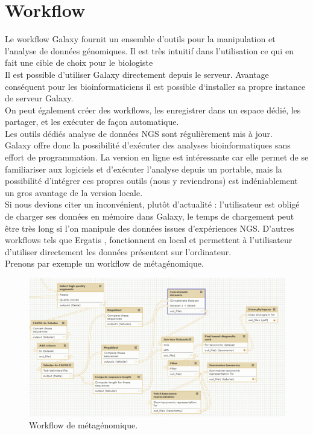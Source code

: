 \section{Workflow}

Le workflow Galaxy fournit un ensemble d’outils pour la manipulation et l’analyse de données génomiques. Il est très intuitif dans l’utilisation ce qui en fait une cible de choix pour le biologiste\\

Il est possible d’utiliser Galaxy directement depuis le serveur. Avantage conséquent pour les bioinformaticiens il est possible d‘installer sa propre instance de serveur Galaxy.\\

On peut également créer des workflows, les enregistrer dans un espace dédié, les partager, et les exécuter de façon automatique.\\

Les outils dédiés analyse de données NGS sont régulièrement mis à jour.\\


Galaxy offre donc la possibilité d’exécuter des analyses bioinformatiques sans effort de programmation. La version en ligne est intéressante car elle permet de se familiariser aux logiciels et d'exécuter l’analyse depuis un portable, mais la possibilité d’intégrer ces propres outils (nous y reviendrons) est indéniablement un gros avantage de la version locale.\\

Si nous devions citer un inconvénient, plutôt d’actualité : l’utilisateur est obligé de charger ses données en mémoire dans Galaxy, le temps de chargement peut être très long si l’on manipule des données issues d’expériences NGS. D’autres workflows tels que Ergatis , fonctionnent en local et permettent à l’utilisateur d’utiliser directement les données présentent sur l'ordinateur.\\

Prenons par exemple un workflow de métagénomique.\\

\begin{figure}[!h]
 \centering
\includegraphics[scale=0.4]{Images/metagenomics.png}
\caption{Workflow de métagénomique.}
\end{figure}

